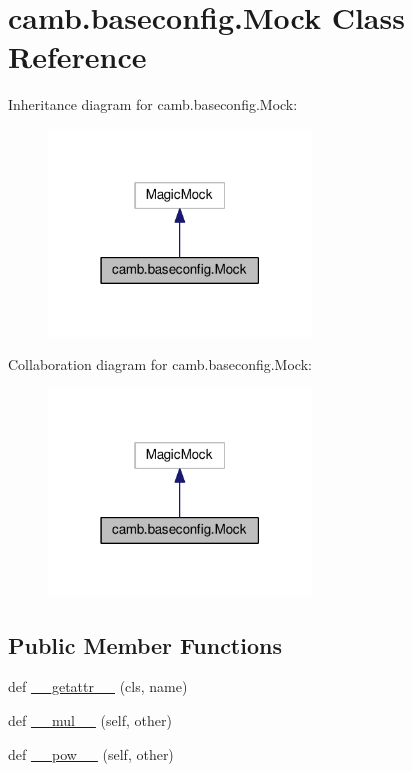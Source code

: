 \hypertarget{classcamb_1_1baseconfig_1_1Mock}{}\section{camb.\+baseconfig.\+Mock Class Reference}
\label{classcamb_1_1baseconfig_1_1Mock}


Inheritance diagram for camb.\+baseconfig.\+Mock\+:
\nopagebreak
\begin{figure}[H]
\begin{center}
\leavevmode
\includegraphics[width=198pt]{classcamb_1_1baseconfig_1_1Mock__inherit__graph}
\end{center}
\end{figure}


Collaboration diagram for camb.\+baseconfig.\+Mock\+:
\nopagebreak
\begin{figure}[H]
\begin{center}
\leavevmode
\includegraphics[width=198pt]{classcamb_1_1baseconfig_1_1Mock__coll__graph}
\end{center}
\end{figure}
\subsection*{Public Member Functions}
\begin{DoxyCompactItemize}
\item 
def \mbox{\hyperlink{classcamb_1_1baseconfig_1_1Mock_a63d325fe225ebbf372eaf6222bde5244}{\+\_\+\+\_\+getattr\+\_\+\+\_\+}} (cls, name)
\item 
def \mbox{\hyperlink{classcamb_1_1baseconfig_1_1Mock_afc933607bc0d93964559132a16f23b36}{\+\_\+\+\_\+mul\+\_\+\+\_\+}} (self, other)
\item 
def \mbox{\hyperlink{classcamb_1_1baseconfig_1_1Mock_a241bdcf1012e5f141c6b4d7849ae14d4}{\+\_\+\+\_\+pow\+\_\+\+\_\+}} (self, other)
\end{DoxyCompactItemize}


